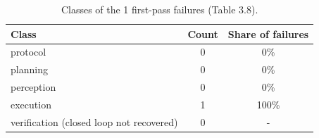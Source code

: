 \begin{table}[htbp]
\centering
\caption{Classes of the 1 first-pass failures (Table 3.8).}
\label{tab:rdt_attribution}
\small
\begin{tabular}{lcc}
\toprule
Class & Count & Share of failures \\
\midrule
protocol & 0 & 0\% \\
planning & 0 & 0\% \\
perception & 0 & 0\% \\
execution & 1 & 100\% \\
verification (closed loop not recovered) & 0 & - \\
\bottomrule
\end{tabular}
\end{table}
